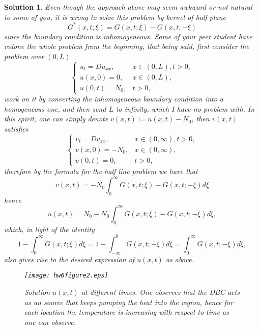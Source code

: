 \documentclass[6pt]{article}
\newtheorem{solution}{Solution}
\numberwithin{equation}{section}
\begin{document}
\begin{enumerate}
\begin{solution}
Even though the approach above may seem awkward or not natural to some of you, it is wrong to solve this problem by kernel of half plane
\[G^*(x,t;\xi)=G(x,t;\xi)-G(x,t;-\xi)\]
since the boundary condition is inhomogeneous.  Some of your peer student have redone the whole problem from the beginning, that being said, first consider the problem over $(0,L)$
\begin{equation}
\left\{
\begin{array}{ll}
u_t=D u_{xx},& x\in (0,L), t>0,\\
u(x,0)=0,&x \in (0,L),\\
u(0,t)=N_0,&t>0,
\end{array}
\right.
\end{equation}
work on it by converting the inhomogeneous boundary condition into a homogeneous one, and then send $L$ to infinity, which I have no problem with.  In this spirit, one can simply denote $v(x,t):=u(x,t)-N_0$, then $v(x,t)$ satisfies
\begin{equation}\label{half}
\left\{
\begin{array}{ll}
v_t=D v_{xx},& x\in (0,\infty), t>0,\\
v(x,0)=-N_0,&x \in (0,\infty),\\
v(0,t)=0,&t>0,
\end{array}
\right.
\end{equation}
therefore by the formula for the half line problem we have that
\[v(x,t)=-N_0\int_0^\infty G(x,t;\xi)-G(x,t;-\xi)d\xi\]
hence
\[u(x,t)=N_0-N_0\int_0^\infty G(x,t;\xi)-G(x,t;-\xi)d\xi,\]
which, in light of the identity
\[1-\int_0^\infty G(x,t;\xi)d\xi=1-\int_{-\infty}^0 G(x,t;-\xi)d\xi=\int_0^\infty G(x,t;-\xi)d\xi,\]
also gives rise to the desired expression of $u(x,t)$ as above.

\begin{figure}[h!]
  \centering
  \texttt{[image: hw6figure2.eps]}
  \caption{Solution $u(x,t)$ at different times.  One observes that the DBC acts as an source that keeps pumping the heat into the region, hence for each location the temperature is increasing with respect to time as one can observe.}\label{figure2}
\end{figure}

\end{solution}



\end{enumerate}
\end{document}
